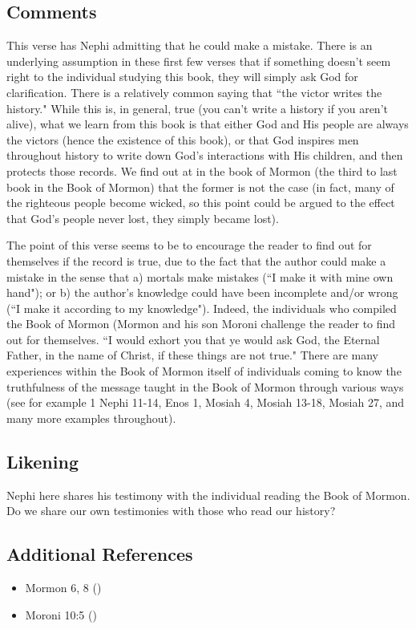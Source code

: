 \documentclass[12pt]{report}
\begin{document}
\subsection{Comments\label{1Nephi1:3:comments}}
This verse has Nephi admitting that he could make a mistake.  There is an underlying assumption in these first few verses that if something doesn't seem right to the individual studying this book, they will simply ask God for clarification.  There is a relatively common saying that ``the victor writes the history."  While this is, in general, true (you can't write a history if you aren't alive), what we learn from this book is that either God and His people are always the victors (hence the existence of this book), or that God inspires men throughout history to write down God's interactions with His children, and then protects those records.  We find out at in the book of Mormon (the third to last book in the Book of Mormon) that the former is not the case (in fact, many of the righteous people become wicked, so this point could be argued to the effect that God's people never lost, they simply became lost).

The point of this verse seems to be to encourage the reader to find out for themselves if the record is true, due to the fact that the author could make a mistake in the sense that a) mortals make mistakes (``I make it with mine own hand"); or b) the author's knowledge could have been incomplete and/or wrong (``I make it according to my knowledge").  Indeed, the individuals who compiled the Book of Mormon (Mormon and his son Moroni challenge the reader to find out for themselves.  ``I would exhort you that ye would ask God, the Eternal Father, in the name of Christ, if these things are not true."  There are many experiences within the Book of Mormon itself of individuals coming to know the truthfulness of the message taught in the Book of Mormon through various ways (see for example 1 Nephi 11-14, Enos 1, Mosiah 4, Mosiah 13-18, Mosiah 27, and many more examples throughout).

\subsection{Likening\label{1Nephi1:3:likening}}
Nephi here shares his testimony with the individual reading the Book of Mormon.  Do we share our own testimonies with those who read our history?

\subsection{Additional References\label{example_references}}
\begin{itemize}
\item Mormon 6, 8 ()
\item Moroni 10:5 ()
\end{itemize}
\end{document}
